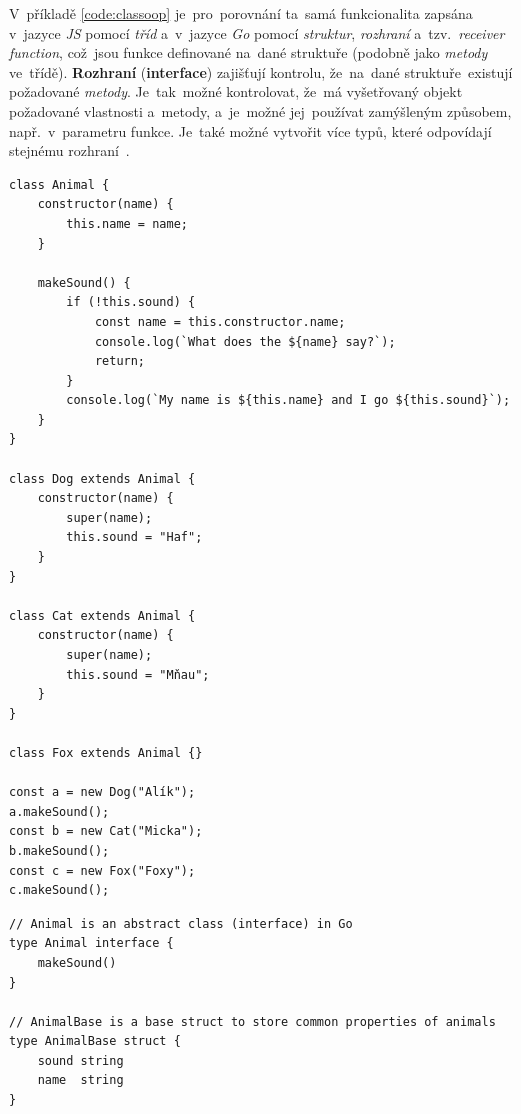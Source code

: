 \documentclass[11pt,a4paper]{report}
\let\oldacrshort\acrshort
\renewcommand{\acrshort}[1]{\emph{\normalsize\color[rgb]{0,0,0}\noindent\oldacrshort{#1}}}
\begin{document}
            V~příkladě \ref{code:classoop} je~pro~porovnání ta~samá funkcionalita zapsána v~jazyce \acrshort{JS} pomocí \emph{tříd} a~v~jazyce \emph{Go} pomocí \emph{struktur}, \emph{rozhraní} a~tzv.~\emph{receiver function}, což~jsou funkce definované na~dané struktuře (podobně jako \emph{metody} ve~třídě). \textbf{Rozhraní} (\textbf{interface}) zajišťují kontrolu, že~na~dané struktuře~existují požadované \emph{metody}. Je~tak~možné kontrolovat, že~má vyšetřovaný objekt požadované vlastnosti a~metody, a~je~možné jej~používat zamýšleným způsobem, např.~v~parametru funkce. Je~také možné vytvořit více typů, které odpovídají stejnému rozhraní~\cite{go:OOP}.

            \begin{code}
                \centering
                \begin{minipage}{.48\textwidth}
                    \begin{verbatim}
class Animal {
    constructor(name) {
        this.name = name;
    }

    makeSound() {
        if (!this.sound) {
            const name = this.constructor.name;
            console.log(`What does the ${name} say?`);
            return;
        }
        console.log(`My name is ${this.name} and I go ${this.sound}`);
    }
}

class Dog extends Animal {
    constructor(name) {
        super(name);
        this.sound = "Haf";
    }
}

class Cat extends Animal {
    constructor(name) {
        super(name);
        this.sound = "Mňau";
    }
}

class Fox extends Animal {}

const a = new Dog("Alík");
a.makeSound();
const b = new Cat("Micka");
b.makeSound();
const c = new Fox("Foxy");
c.makeSound();   
                    \end{verbatim}
                \end{minipage}
                \hfill %
                \begin{minipage}{.48\textwidth}
                    \begin{verbatim}
// Animal is an abstract class (interface) in Go
type Animal interface {
    makeSound()
}

// AnimalBase is a base struct to store common properties of animals
type AnimalBase struct {
    sound string
    name  string
}


\end{verbatim}
\end{minipage}
\end{code}
\end{document}
